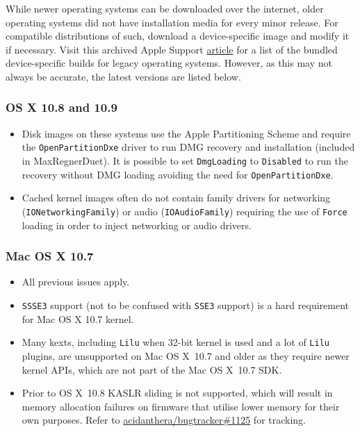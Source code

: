 \documentclass[]{article}
\makeatletter
\renewcommand{\label}[1]{%
\zref@wrapper@immediate{\oldlabel{#1}}}  %
\makeatother
\begin{document}
While newer operating systems can be downloaded over the internet,
older operating systems did not have installation media for every minor
release. For compatible distributions of such, download a device-specific
image and modify it if necessary. Visit this archived Apple Support
\href{https://web.archive.org/web/20170705003629/https://support.apple.com/en-us/HT204319}{article}
for a list of the bundled device-specific builds for legacy operating systems.
However, as this may not always be accurate, the latest versions are listed below.

\subsubsection{OS X 10.8 and 10.9}\label{legacy108}

\begin{itemize}
  \item Disk images on these systems use the Apple Partitioning Scheme
    and require the \texttt{OpenPartitionDxe} driver to run DMG recovery
    and installation (included in MaxRegnerDuet). It is possible to set
    \texttt{DmgLoading} to \texttt{Disabled} to run the recovery
    without DMG loading avoiding the need for \texttt{OpenPartitionDxe}.
  \item Cached kernel images often do not contain family drivers
    for networking (\texttt{IONetworkingFamily}) or audio
    (\texttt{IOAudioFamily}) requiring the use of \texttt{Force}
    loading in order to inject networking or audio drivers.
\end{itemize}

\subsubsection{Mac OS X 10.7}\label{legacy107}

\begin{itemize}
  \item All previous issues apply.
  \item \texttt{SSSE3} support (not to be confused with \texttt{SSE3} support)
    is a hard requirement for Mac OS X 10.7 kernel.
  \item Many kexts, including \texttt{Lilu} when 32-bit kernel
    is used and a lot of \texttt{Lilu} plugins, are
    unsupported on Mac OS X~10.7 and older as they require newer
    kernel APIs, which are not part of the Mac OS X~10.7 SDK.
  \item Prior to OS X~10.8 KASLR sliding is not supported, which
    will result in memory allocation failures on firmware
    that utilise lower memory for their own purposes. Refer to
    \href{https://github.com/acidanthera/bugtracker/issues/1125}{acidanthera/bugtracker\#1125}
    for tracking.
\end{itemize}
\end{document}
